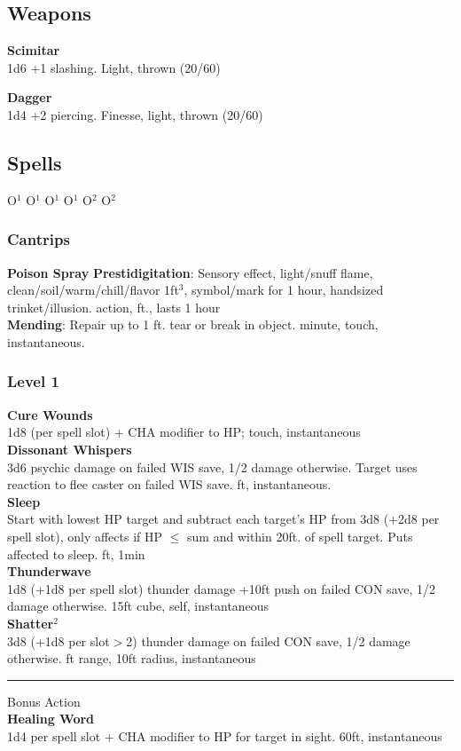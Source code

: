 \documentclass[letterpaper,10pt,twoside,twocolumn,openany]{book}
\begin{document}
\subsection{Weapons}
\textbf{Scimitar} \\
1d6 +1 slashing. Light, thrown (20/60)

\textbf{Dagger} \\
1d4 +2 piercing. Finesse, light, thrown (20/60)

\subsection{Spells}
\hspace{5em}O$^1$ O$^1$ O$^1$ O$^1$ O$^2$ O$^2$\\
\subsubsection{Cantrips}
\textbf{Poison Spray}
\textbf{Prestidigitation}: Sensory effect, light/snuff flame, clean/soil/warm/chill/flavor 1ft$^3$, symbol/mark for 1 hour, handsized trinket/illusion.  {\sc action,  ft., lasts 1 hour}\\
\textbf{Mending}: Repair up to 1 ft. tear or break in object. { minute, touch, instantaneous.}\\
\subsubsection{Level 1}
\textbf{Cure Wounds}\\
1d8 (per spell slot) + CHA modifier to HP; {\sc touch, instantaneous}\\
\textbf{Dissonant Whispers}\\
3d6 psychic damage on failed WIS save, 1/2 damage otherwise. Target uses reaction to flee caster on failed WIS save.  { ft, instantaneous}.\\
\textbf{Sleep}\\
Start with lowest HP target and subtract each target's HP from 3d8 (+2d8 per spell slot), only affects if HP $\leq$ sum and within 20ft. of spell target. Puts affected to sleep. { ft, 1min}\\
\textbf{Thunderwave}\\
1d8 (+1d8 per spell slot) thunder damage +10ft push on failed CON save, 1/2 damage otherwise. {\sc 15ft cube, self, instantaneous}\\
\textbf{Shatter$^2$}\\
3d8 (+1d8 per slot$>$2) thunder damage on failed CON save, 1/2 damage otherwise. { ft range, 10ft radius, instantaneous}\\
\rule{1.1in}{0pt}Bonus Action\\
\textbf{Healing Word}\\
1d4 per spell slot + CHA modifier to HP for target in sight. {\sc 60ft, instantaneous}\\
\end{document}
